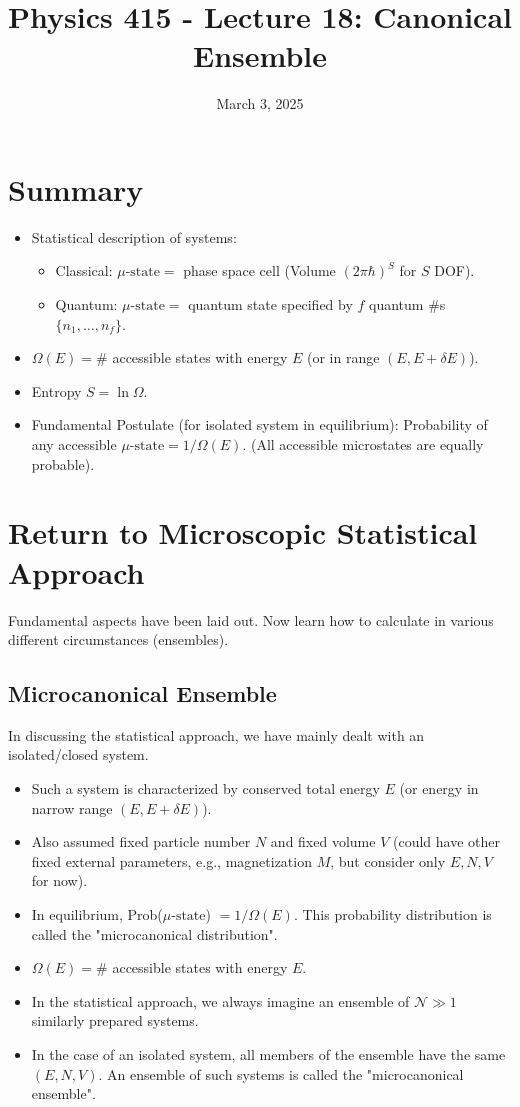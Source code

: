 \documentclass[11pt]{article}
\title{Physics 415 - Lecture 18: Canonical Ensemble}
\date{March 3, 2025}
\author{} %
\newcommand{\muState}{\mu\text{-state}} %
\newcommand{\deltaE}{\delta E}
\begin{document}
\maketitle
\thispagestyle{empty}

\section*{Summary}

\begin{itemize}
    \item Statistical description of systems:
        \begin{itemize}
            \item Classical: $\muState =$ phase space cell (Volume $(2\pi\hbar)^S$ for $S$ DOF).
            \item Quantum: $\muState =$ quantum state specified by $f$ quantum \#s $\{n_1, \dots, n_f\}$.
        \end{itemize}
    \item $\Omega(E) = \#$ accessible states with energy $E$ (or in range $(E, E+\deltaE)$).
    \item Entropy $S = \ln \Omega$.
    \item Fundamental Postulate (for isolated system in equilibrium): Probability of any accessible $\muState = 1/\Omega(E)$. (All accessible microstates are equally probable).
\end{itemize}

\section*{Return to Microscopic Statistical Approach}

Fundamental aspects have been laid out. Now learn how to calculate in various different circumstances (ensembles).

\subsection*{Microcanonical Ensemble}
In discussing the statistical approach, we have mainly dealt with an isolated/closed system.
\begin{itemize}
    \item Such a system is characterized by conserved total energy $E$ (or energy in narrow range $(E, E+\deltaE)$).
    \item Also assumed fixed particle number $N$ and fixed volume $V$ (could have other fixed external parameters, e.g., magnetization $M$, but consider only $E, N, V$ for now).
    \item In equilibrium, Prob($\muState$) $= 1/\Omega(E)$. This probability distribution is called the "microcanonical distribution".
    \item $\Omega(E) = \#$ accessible states with energy $E$.
    \item In the statistical approach, we always imagine an ensemble of $\mathcal{N} \gg 1$ similarly prepared systems.
    \item In the case of an isolated system, all members of the ensemble have the same $(E, N, V)$. An ensemble of such systems is called the "microcanonical ensemble".
\end{itemize}
\end{document}
